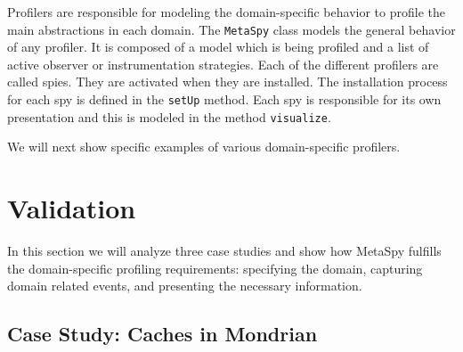 \documentclass[runningheads]{llncs}
\newcommand{\project}{{\sc MetaSpy}\xspace}
\newcommand{\ct}{\lstinline[backgroundcolor=\color{white},basicstyle=\footnotesize\ttfamily]}
\newcommand{\seclabel}[1]{\label{sec:#1}}
\begin{document}
Profilers are responsible for modeling the domain-specific behavior to profile the main abstractions in each domain.
The \ct{MetaSpy} class models the general behavior of any profiler. It is composed of a model which is being profiled and a list of active observer or instrumentation strategies.
Each of the different profilers are called spies. They are activated when they are installed. The installation process for each spy is defined in the \ct{setUp} method.
Each spy is responsible for its own presentation and this is modeled in the method \ct{visualize}.

We will next show specific examples of various domain-specific profilers.


\section{Validation}\seclabel{validation}

In this section we will analyze three case studies and show how \project fulfills the domain-specific profiling requirements: specifying the domain, capturing domain related events, and presenting the necessary information.

\subsection{Case Study: Caches in Mondrian}
\end{document}
